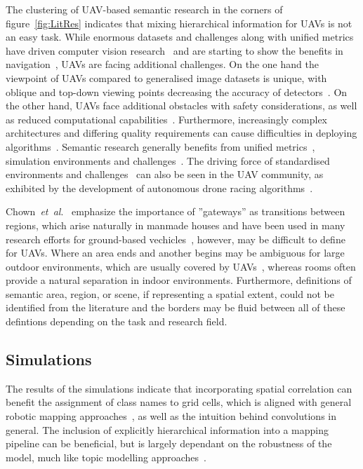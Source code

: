 \documentclass[twocolumn,letterpaper]{IEEEAerospaceCLS}  %
\newcommand{\abbreviation}[1]{\emph{#1}.}
\newcommand{\etal}{\abbreviation{et~al}}
\begin{document}
The clustering of UAV-based semantic research in the corners of figure~\ref{fig:LitRes} indicates that mixing hierarchical information for UAVs is not an easy task. While enormous datasets and challenges along with unified metrics have driven computer vision research~\cite{alom_history_2018,corke_what_2020} and are starting to show the benefits in navigation~\cite{anderson_evaluation_2018,chaplot_object_2020}, UAVs are facing additional challenges.
On the one hand the viewpoint of UAVs compared to generalised image datasets is unique, with oblique and top-down viewing points decreasing the accuracy of detectors~\cite{richardwebster_psyphy:_2019}. On the other hand, UAVs face additional obstacles with safety considerations, as well as reduced computational capabilities~\cite{boroujerdian_mavbench_2018,mandel_method_2020}. Furthermore, increasingly complex architectures and differing quality requirements can cause difficulties in deploying algorithms~\cite{cervera_try_2019,malatova_how_2020}. 
Semantic research generally benefits from unified metrics~\cite{anderson_evaluation_2018}, simulation environments and challenges~\cite{chaplot_object_2020,yang_visual_2018}. The driving force of standardised environments and challenges~\cite{corke_what_2020} can also be seen in the UAV community, as exhibited by the development of autonomous drone racing algorithms~\cite{moon_challenges_2019}.

Chown~\etal~\cite{chown_prototypes_1995} emphasize the importance of ''gateways'' as transitions between regions, which arise naturally in manmade houses and have been used in many research efforts for ground-based vechicles~\cite{kuipers_local_2004,wu_learning_2018,krishnan_visual_2010}, however, may be difficult to define for UAVs. Where an area ends and another begins may be ambiguous for large outdoor environments, which are usually covered by UAVs~\cite{vanegas_novel_2018,shetty_implementation_2020}, whereas rooms often provide a natural separation in indoor environments. Furthermore, definitions of semantic area, region, or scene, if representing a spatial extent, could not be identified from the literature and the borders may be fluid between all of these defintions depending on the task and research field.

\subsection{Simulations} \label{ssec:DiscSim}
The results of the simulations indicate that incorporating spatial correlation can benefit the assignment of class names to grid cells, which is aligned with general robotic mapping approaches~\cite{thrun_probabilistic_2005}, as well as the intuition behind convolutions in general. The inclusion of explicitly hierarchical information into a mapping pipeline can be beneficial, but is largely dependant on the robustness of the model, much like topic modelling approaches~\cite{fei-fei_bayesian_2005,blei_latent_2003}.
\end{document}
